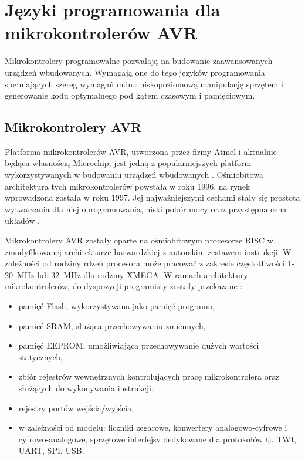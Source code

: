 \chapter{Języki programowania dla mikrokontrolerów AVR}
\label{ch:02}

Mikrokontrolery programowalne pozwalają na budowanie zaawansowanych urządzeń wbudowanych. Wymagają one do tego języków programowania spełniających szereg wymagań m.in.: niskopoziomową manipulację sprzętem i generowanie kodu optymalnego pod kątem czasowym i pamięciowym.

\section{Mikrokontrolery AVR}
Platforma mikrokontrolerów AVR, utworzona przez firmy Atmel i aktualnie będąca własnością Microchip, jest jedną z popularniejszych platform wykorzystywanych w budowaniu urządzeń wbudowanych \cite{AVRMicrocontrollersMarket2024}. Ośmiobitowa architektura tych mikrokontrolerów powstała w roku 1996, na rynek wprowadzona została w roku 1997. Jej najważniejszymi cechami stały się prostota wytwarzania dla niej oprogramowania, niski pobór mocy oraz przystępna cena układów \cite{kunikowskiOverviewATmegaAVR2015}.

Mikrokontrolery AVR zostały oparte na ośmiobitowym procesorze RISC w zmodyfikowanej architekturze harwardzkiej z autorskim zestawem instrukcji. W zależności od rodziny rdzeń procesora może pracować z zakresie częstotliwości 1-20~MHz lub 32~MHz dla rodziny XMEGA.
W ramach architektury mikrokontrolerów, do dyspozycji programisty zostały przekazane \cite{30009630M8bitPIC2018}:
\begin{itemize}
\item pamięć Flash, wykorzystywana jako pamięć programu,
\item pamieć SRAM, służąca przechowywaniu zmiennych,
\item pamięć EEPROM, umożliwiająca przechowywanie dużych wartości statycznych,
\item zbiór rejestrów wewnętrznych kontrolujących pracę mikrokontrolera oraz służących do wykonywania instrukcji,
\item rejestry portów wejścia/wyjścia,
\item w zależności od modelu: liczniki zegarowe, konwertery analogowo-cyfrowe i cyfrowo-analogowe, sprzętowe interfejsy dedykowane dla protokołów tj. TWI, UART, SPI, USB.
\end{itemize}

